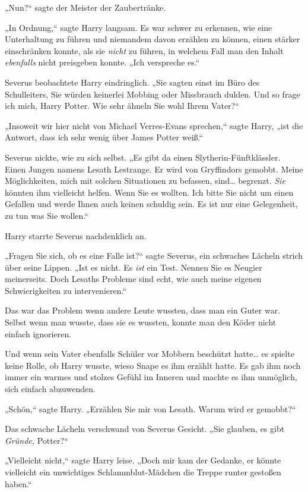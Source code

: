 {„Nun?“ sagte der Meister der Zaubertränke.

„In Ordnung,“ sagte Harry langsam. Es war schwer zu erkennen, wie eine Unterhaltung zu führen und niemandem davon erzählen zu können, einen stärker einschränken konnte, als sie \emph{nicht} zu führen, in welchem Fall man den Inhalt \emph{ebenfalls} nicht preisgeben konnte. „Ich verspreche es.“

Severus beobachtete Harry eindringlich. „Sie sagten einst im Büro des Schulleiters, Sie würden keinerlei Mobbing oder Missbrauch dulden. Und so frage ich mich, Harry Potter. Wie sehr ähneln Sie wohl Ihrem Vater?“

„Insoweit wir hier nicht von Michael Verres-Evans sprechen,“ sagte Harry, „ist die Antwort, dass ich sehr wenig über James Potter weiß.“

Severus nickte, wie zu sich selbst. „Es gibt da einen Slytherin-Fünftklässler. Einen Jungen namens Lesath Lestrange. Er wird von Gryffindors gemobbt. Meine Möglichkeiten, mich mit solchen Situationen zu befassen, sind… begrenzt. \emph{Sie} könnten ihm vielleicht helfen. Wenn Sie es wollten. Ich bitte Sie nicht um einen Gefallen und werde Ihnen auch keinen schuldig sein. Es ist nur eine Gelegenheit, zu tun was Sie wollen.“

Harry starrte Severus nachdenklich an.

„Fragen Sie sich, ob es eine Falle ist?“ sagte Severus, ein schwaches Lächeln strich über seine Lippen. „Ist es nicht. Es \emph{ist} ein Test. Nennen Sie es Neugier meinerseits. Doch Lesaths Probleme sind echt, wie auch meine eigenen Schwierigkeiten zu intervenieren.“

Das war das Problem wenn andere Leute wussten, dass man ein Guter war. Selbst wenn man wusste, dass sie es wussten, konnte man den Köder nicht einfach ignorieren.

Und wenn sein Vater ebenfalls Schüler vor Mobbern beschützt hatte… es spielte keine Rolle, ob Harry wusste, wieso Snape es ihm erzählt hatte. Es gab ihm noch immer ein warmes und stolzes Gefühl im Inneren und machte es ihm unmöglich, sich einfach abzuwenden.

„Schön,“ sagte Harry. „Erzählen Sie mir von Lesath. Warum wird er gemobbt?“

Das schwache Lächeln verschwand von Severus Gesicht. „Sie glauben, es gibt \emph{Gründe,} Potter?“

„Vielleicht nicht,“ sagte Harry leise. „Doch mir kam der Gedanke, er könnte vielleicht ein unwichtiges Schlammblut-Mädchen die Treppe runter gestoßen haben.“

}
